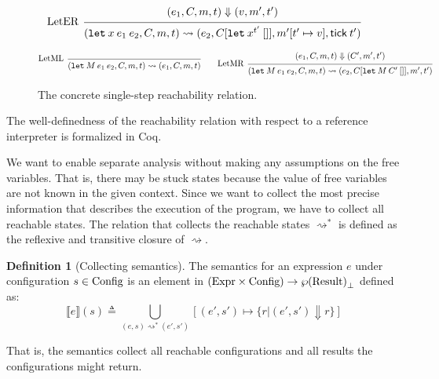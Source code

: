 \documentclass[acmsmall,screen,review]{acmart}
\theoremstyle{definition}
\newtheorem{definition}{Definition}[section]
\newcommand*{\Expr}{\text{Expr}}
\newcommand*{\Time}{\mathbb{T}}
\newcommand*{\mem}{m}
\newcommand*{\Config}[1]{\text{Config}\vphantom{#1}}
\newcommand*{\Result}[1]{\text{Result}\vphantom{#1}}
\newcommand*{\sembracket}[1]{\lBrack{#1}\rBrack}
\newcommand*{\tick}{\mathsf{tick}}
\begin{document}
\begin{figure}[htb]
  \[
    \begin{prooftree}
      \hypo{
        \begin{matrix}
          (e_{1}, C, \mem, t)
          \Downarrow
          (v, \mem', t')
        \end{matrix}
      }
      \infer[left label=LetER]1{
      (\mathtt{let}\:x\:e_1\:e_2, C, \mem, t)
      \rightsquigarrow
      (e_{2}, C[\mathtt{let}\:x^{t'}\:[]], \mem'[t'\mapsto v], \tick\:t')
      }
    \end{prooftree}
  \]

  \[
    \begin{prooftree}
      \infer[left label=LetML]0{
      (\mathtt{let}\:M\:e_{1}\:e_{2}, C, \mem, t)
      \rightsquigarrow
      (e_{1}, C, \mem, t)
      }
    \end{prooftree}\qquad
    \begin{prooftree}
      \hypo{
        \begin{matrix}
          (e_{1}, C, \mem, t)
          \Downarrow
          (C', \mem', t')
        \end{matrix}
      }
      \infer[left label=LetMR]1{
      (\mathtt{let}\:M\:e_{1}\:e_{2}, C, \mem, t)
      \rightsquigarrow
      (e_{2}, C[\mathtt{let}\:M\:C'\:[]], \mem', t')
      }
    \end{prooftree}
  \]
  \caption{The concrete single-step reachability relation.}
  \label{fig:concreach}
\end{figure}
The well-definedness of the reachability relation with respect to a reference interpreter is formalized in Coq.

We want to enable separate analysis without making any assumptions on the free variables.
That is, there may be stuck states because the value of free variables are not known in the given context.
Since we want to collect the most precise information that describes the execution of the program, we have to collect all reachable states.
The relation that collects the reachable states $\rightsquigarrow^{*}$ is defined as the reflexive and transitive closure of $\rightsquigarrow$.

\begin{definition}[Collecting semantics]
  The semantics for an expression $e$ under configuration $s\in\Config{\Time}$ is an element in $(\Expr\times\Config{\Time})\rightarrow{\wp(\Result{\Time})}_{\bot}$ defined as:
  \[
    \sembracket{e}(s)\triangleq\bigcup_{(e,s)\rightsquigarrow^{*}(e',s')}[(e',s')\mapsto\{r|(e',s')\Downarrow r\}]
  \]

  That is, the semantics collect all reachable configurations and all results the configurations might return.
\end{definition}
\end{document}
